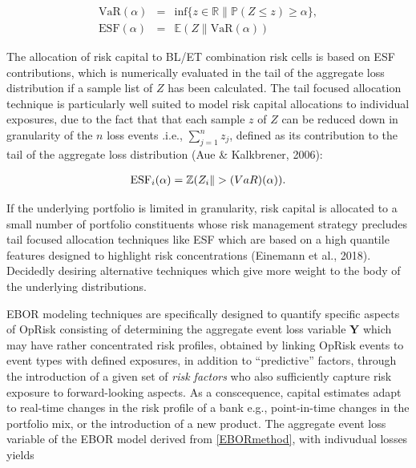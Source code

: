 \documentclass{DissertateUSU}
\begin{document}
\singlespacing

\begin{eqnarray}
\mbox{VaR}(\alpha) &=& \mbox{inf}\{z \in \mathbb{R}\| \mathbb{P}(Z \leq z) \geq \alpha \},\\
\mbox{ESF}(\alpha) &=& \mathbb{E}(Z\| \mbox{VaR}(\alpha))
\end{eqnarray} \doublespacing

The allocation of risk capital to BL/ET combination risk cells is based
on ESF contributions, which is numerically evaluated in the tail of the
aggregate loss distribution if a sample list of \(Z\) has been
calculated. The tail focused allocation technique is particularly well
suited to model risk capital allocations to individual exposures, due to
the fact that that each sample \(z\) of \(Z\) can be reduced down in
granularity of the \(n\) loss events .i.e., \(\sum_{j=1}^n z_j\),
defined as its contribution to the tail of the aggregate loss
distribution (Aue \& Kalkbrener, 2006):

\singlespacing

\begin{eqnarray}
\mbox{ESF}_i(\alpha) = \mathbb{Z}(Z_i\| > \mbox(VaR)(\alpha)).
\end{eqnarray} \doublespacing

If the underlying portfolio is limited in granularity, risk capital is
allocated to a small number of portfolio constituents whose risk
management strategy precludes tail focused allocation techniques like
ESF which are based on a high quantile features designed to highlight
risk concentrations (Einemann et al., 2018). Decidedly desiring
alternative techniques which give more weight to the body of the
underlying distributions.\medskip

EBOR modeling techniques are specifically designed to quantify specific
aspects of OpRisk consisting of determining the aggregate event loss
variable \(\mathbf{Y}\) which may have rather concentrated risk
profiles, obtained by linking OpRisk events to event types with defined
exposures, in addition to ``predictive'' factors, through the
introduction of a given set of \emph{risk factors} who also sufficiently
capture risk exposure to forward-looking aspects. As a conscequence,
capital estimates adapt to real-time changes in the risk profile of a
bank e.g., point-in-time changes in the portfolio mix, or the
introduction of a new product. The aggregate event loss variable of the
EBOR model derived from \ref{EBORmethod}, with indivudual losses yields
\end{document}
